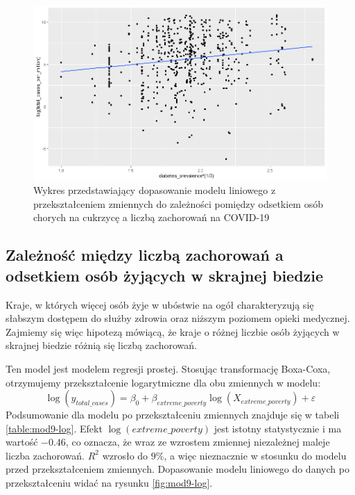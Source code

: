 \documentclass[12pt]{mwbk}
\theoremstyle{plain}
\theoremstyle{definition}
\theoremstyle{definition}
\newcommand\zrodlo[1]{\par\vspace{-3mm}{\small\textit{Źródło: }#1 }}
\begin{document}
\begin{figure}[!ht]
	\centering
	\includegraphics[width=\linewidth]{rys/mod8-log.png}
	\caption{Wykres przedstawiający dopasowanie modelu liniowego z przekształceniem zmiennych do zależności pomiędzy odsetkiem osób chorych na cukrzycę a liczbą zachorowań na COVID-19}
	\label{fig:mod8-log}
	\zrodlo{Opracowanie własne}
\end{figure}



\subsection{Zależność między liczbą zachorowań a odsetkiem osób żyjących w skrajnej biedzie}

Kraje, w których więcej osób żyje w ubóstwie na ogół charakteryzują się słabszym dostępem do służby zdrowia oraz niższym poziomem opieki medycznej. Zajmiemy się więc hipotezą mówiącą, że kraje o różnej liczbie osób żyjących w skrajnej biedzie różnią się liczbą zachorowań.



Ten model jest modelem regresji prostej. Stosując transformację Boxa-Coxa, otrzymujemy przekształcenie logarytmiczne dla obu zmiennych w modelu:
$$\log(y_{total\_cases})=\beta_0+\beta_{extreme\_poverty}\log(X_{extreme\_poverty})+\varepsilon$$
Podsumowanie dla modelu po przekształceniu zmiennych znajduje się w tabeli \ref{table:mod9-log}. Efekt $\log(extreme\_poverty)$ jest istotny statystycznie i ma wartość $-0.46$, co oznacza, że wraz ze wzrostem zmiennej niezależnej maleje liczba zachorowań. $R^2$ wzrosło do $9\%$, a więc nieznacznie w stosunku do modelu przed przekształceniem zmiennych. Dopasowanie modelu liniowego do danych po przekształceniu widać na rysunku \ref{fig:mod9-log}.
\end{document}
